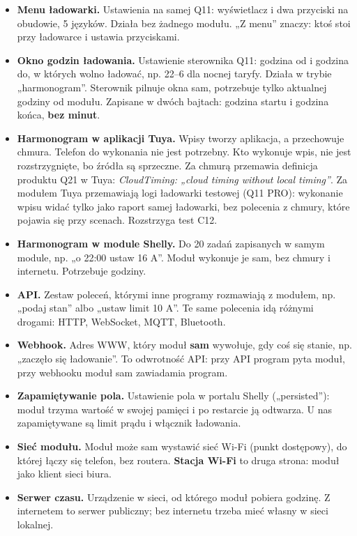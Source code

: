 \documentclass[11pt,a4paper]{article}
\begin{document}
\begin{itemize}
\item \textbf{Menu ładowarki.} Ustawienia na samej Q11: wyświetlacz i dwa przyciski na obudowie, 5 języków. Działa bez żadnego modułu. „Z menu” znaczy: ktoś stoi przy ładowarce i ustawia przyciskami.
\item \textbf{Okno godzin ładowania.} Ustawienie sterownika Q11: godzina od i godzina do, w których wolno ładować, np. 22–6 dla nocnej taryfy. Działa w trybie „harmonogram”. Sterownik pilnuje okna sam, potrzebuje tylko aktualnej godziny od modułu. Zapisane w dwóch bajtach: godzina startu i godzina końca, \textbf{bez minut}.
\item \textbf{Harmonogram w aplikacji Tuya.} Wpisy tworzy aplikacja, a przechowuje chmura. Telefon do wykonania nie jest potrzebny. Kto wykonuje wpis, nie jest rozstrzygnięte, bo źródła są sprzeczne. Za chmurą przemawia definicja produktu Q21 w Tuya: \emph{CloudTiming: „cloud timing without local timing”}. Za modułem Tuya przemawiają logi ładowarki testowej (Q11 PRO): wykonanie wpisu widać tylko jako raport samej ładowarki, bez polecenia z chmury, które pojawia się przy scenach. Rozstrzyga test C12.
\item \textbf{Harmonogram w module Shelly.} Do 20 zadań zapisanych w samym module, np. „o 22:00 ustaw 16 A”. Moduł wykonuje je sam, bez chmury i internetu. Potrzebuje godziny.
\item \textbf{API.} Zestaw poleceń, którymi inne programy rozmawiają z modułem, np. „podaj stan” albo „ustaw limit 10 A”. Te same polecenia idą różnymi drogami: HTTP, WebSocket, MQTT, Bluetooth.
\item \textbf{Webhook.} Adres WWW, który moduł \textbf{sam} wywołuje, gdy coś się stanie, np. „zaczęło się ładowanie”. To odwrotność API: przy API program pyta moduł, przy webhooku moduł sam zawiadamia program.
\item \textbf{Zapamiętywanie pola.} Ustawienie pola w portalu Shelly („persisted”): moduł trzyma wartość w swojej pamięci i po restarcie ją odtwarza. U nas zapamiętywane są limit prądu i włącznik ładowania.
\item \textbf{Sieć modułu.} Moduł może sam wystawić sieć Wi-Fi (punkt dostępowy), do której łączy się telefon, bez routera. \textbf{Stacja Wi-Fi} to druga strona: moduł jako klient sieci biura.
\item \textbf{Serwer czasu.} Urządzenie w sieci, od którego moduł pobiera godzinę. Z internetem to serwer publiczny; bez internetu trzeba mieć własny w sieci lokalnej.
\end{itemize}
\end{document}
